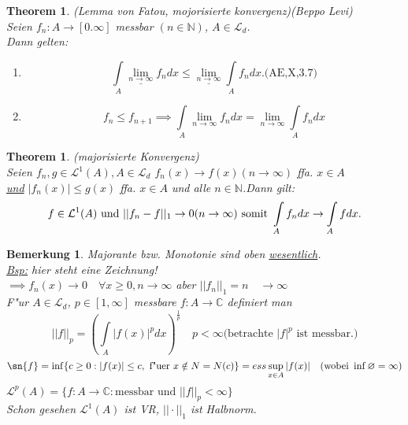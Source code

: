 \documentclass[a4paper,11pt]{book}
\newcommand{\C}{{\mathbb C}}
\newcommand{\N}{{\mathbb N}}
\newcommand{\ssL}{{\mathcal L}}
\def\folgt{\ensuremath{\implies}}
\newtheorem{Theo}[Def]{Theorem}
\newtheorem*{BemNO}{Bemerkung}
\theoremstyle{nonumberplain}
\begin{document}
\begin{Theo}(Lemma von Fatou, mojorisierte konvergenz)(Beppo Levi)\\
Seien $f_{n}:A\rightarrow [0.\infty]$ messbar $(n\in \N)$, $A\in\ssL_{d}$.\\
Dann gelten:
\begin{enumerate}
\item [a)]
\begin{displaymath}
\int\limits_{A} \underline{\lim_{n\rightarrow \infty}} f_{n}dx \leq \underline{\lim_{n\rightarrow \infty}} \int\limits_{A} f_{n} dx. \textrm{(AE,X,3.7)}
\end{displaymath}
\item [b)]
\begin{displaymath}
f_{n} \leq f_{n+1} \folgt \int\limits_{A} \lim_{n\rightarrow \infty}f_{n}dx=\lim_{n\rightarrow \infty} \int\limits_{A} f_{n}dx
\end{displaymath}
\end{enumerate}
\end{Theo}
\begin{Theo}(majorisierte Konvergenz)\\
Seien $f_{n},g \in \ssL^{1}(A), A\in \ssL_{d}$ $f_{n}(x)\rightarrow f(x) (n\rightarrow \infty)$ ffa. $x\in A$\\
 \underline{und} $ |f_{n}(x)|\leq g(x)$ ffa.
$x\in A$ und alle $n\in \N$.Dann gilt:
\begin{displaymath}
f\in \ssL^{1}(A) \textrm{ und } ||f_{n}-f||_{1} \rightarrow 0 (n\rightarrow \infty)\\
\textrm{ somit } \int\limits_{A} f_{n}dx \rightarrow \int\limits_{A} fdx.
\end{displaymath}
\end{Theo}
\begin{BemNO}Majorante bzw. Monotonie sind oben \underline{wesentlich}.\\
\underline{Bsp:} hier steht eine Zeichnung!\\
$\folgt f_{n}(x) \rightarrow 0 \quad\forall x\geq 0, n\rightarrow \infty$ aber 
$||f_{n}||_{1} = n \quad\rightarrow\infty$\\
F"ur $A\in\ssL_{d}$, $p\in[1,\infty]$ messbare $f:A\rightarrow \C$ definiert man
\begin{displaymath}
||f||_{p} = (\int\limits_{A}|f(x)|^{p}dx)^{\frac{1}{p}} \quad p<\infty \textrm{(betrachte $|f|^{p}$ ist messbar.)}
\end{displaymath}
\begin{displaymath}
\sn{f}=\inf\{c\geq 0: |f(x)| \leq c,\textrm{ f"uer }x\notin N=N(c)\}= ess \sup_{x\in A} |f(x)| \quad (\textrm{wobei } \inf \varnothing = \infty )
\end{displaymath}
$\ssL^{p}(A) = \{f:A\rightarrow \C : \textrm{messbar und }  ||f||_{p} <\infty \}$\\
Schon gesehen $\ssL^{1}(A)$ ist VR, $||\cdot||_{1}$ ist Halbnorm.
\end{BemNO}
\end{document}
